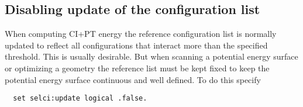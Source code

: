 \subsection{Disabling update of the configuration list}

When computing CI+PT energy the reference configuration list is
normally updated to reflect all configurations that interact more than
the specified threshold.  This is usually desirable.  But when
scanning a potential energy surface or optimizing a geometry the
reference list must be kept fixed to keep the potential energy surface
continuous and well defined.  To do this specify
\begin{verbatim}
  set selci:update logical .false.
\end{verbatim}


